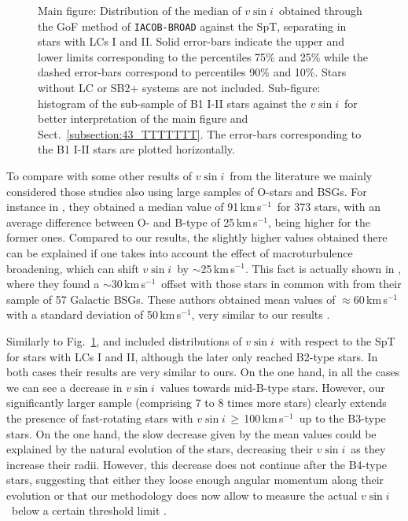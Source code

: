 \documentclass{aa}
\newcommand{\kms}{\mbox{km\,s$^{-1}$}}
\newcommand{\vsini}{\mbox{$v\sin i$}}
\begin{document}
\begin{figure}[!t]
\centering
{}
\caption{Main figure: Distribution of the median of \vsini\ obtained through the GoF method of {\tt IACOB-BROAD} against the SpT, separating in stars with LCs I and II. Solid error-bars indicate the upper and lower limits corresponding to the percentiles 75\% and 25\% while the dashed error-bars correspond to percentiles 90\% and 10\%. Stars without LC or SB2+ systems are not included. Sub-figure: histogram of the sub-sample of B1 I-II stars against the \vsini\ for better interpretation of the main figure and Sect.~\ref{subsection:43_TTTTTTT}. The error-bars corresponding to the B1 I-II stars are plotted horizontally.} 
\label{fig:vsini_spt_bars}
\end{figure}

To compare with some other results of \vsini\ from the literature we mainly considered those studies also using large samples of O-stars and BSGs. For instance in \citet{1997MNRAS.284..265H}, they obtained a median value of 91\,\kms\ for 373 stars, with an average difference between O- and B-type of 25\,\kms, being higher for the former ones. Compared to our results, the slightly higher values obtained there can be explained if one takes into account the effect of macroturbulence broadening, which can shift \vsini\ by $\sim$25\,\kms \citep{2014A&A...562A.135S}. This fact is actually shown in \citet{2010MNRAS.404.1306F}, where they found a $\sim$30\,\kms\ offset with those stars in common with \citet{1997MNRAS.284..265H} from their sample of 57 Galactic BSGs. These authors obtained mean values of $\approx$60\,\kms with a standard deviation of 50\,\kms, very similar to our results \citep[see also][for more examples including BSGs]{2008A&A...479..541H,2014A&A...562A.135S}.

Similarly to Fig.~\ref{fig:vsini_spt_bars}, \citet{2010MNRAS.404.1306F} and \citet{2014A&A...562A.135S} included distributions of \vsini\ with respect to the SpT for stars with LCs I and II, although the later only reached B2-type stars. In both cases their results are very similar to ours. On the one hand, in all the cases we can see a decrease in \vsini\ values towards mid-B-type stars. However, our significantly larger sample (comprising 7 to 8 times more stars) clearly extends the presence of fast-rotating stars with \vsini\,$\geq$\,100\,\kms\ up to the B3-type stars. On the one hand, the slow decrease given by the mean values could be explained by the natural evolution of the stars, decreasing their \vsini\ as they increase their radii. However, this decrease does not continue after the B4-type stars, suggesting that either they loose enough angular momentum along their evolution \citep[e.g. via stellar winds,][]{2010A&A...512L...7V} or that our methodology does now allow to measure the actual \vsini\ below a certain threshold limit \citep[see][]{2017A&A...597A..22S}.
\end{document}
